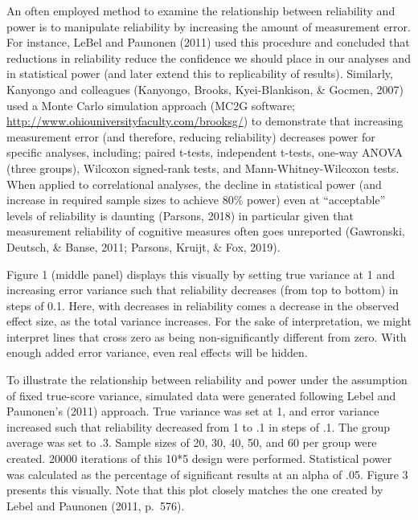 \documentclass[english,,man]{apa6}
\begin{document}
An often employed method to examine the relationship between reliability and power is to manipulate reliability by increasing the amount of measurement error. For instance, LeBel and Paunonen (2011) used this procedure and concluded that reductions in reliability reduce the confidence we should place in our analyses and in statistical power (and later extend this to replicability of results). Similarly, Kanyongo and colleagues (Kanyongo, Brooks, Kyei-Blankison, \& Gocmen, 2007) used a Monte Carlo simulation approach (MC2G software; \url{http://www.ohiouniversityfaculty.com/brooksg/}) to demonstrate that increasing measurement error (and therefore, reducing reliability) decreases power for specific analyses, including; paired t-tests, independent t-tests, one-way ANOVA (three groups), Wilcoxon signed-rank tests, and Mann-Whitney-Wilcoxon tests. When applied to correlational analyses, the decline in statistical power (and increase in required sample sizes to achieve 80\% power) even at \enquote{acceptable} levels of reliability is daunting (Parsons, 2018) in particular given that measurement reliability of cognitive measures often goes unreported (Gawronski, Deutsch, \& Banse, 2011; Parsons, Kruijt, \& Fox, 2019).

Figure 1 (middle panel) displays this visually by setting true variance at 1 and increasing error variance such that reliability decreases (from top to bottom) in steps of 0.1. Here, with decreases in reliability comes a decrease in the observed effect size, as the total variance increases. For the sake of interpretation, we might interpret lines that cross zero as being non-significantly different from zero. With enough added error variance, even real effects will be hidden.

To illustrate the relationship between reliability and power under the assumption of fixed true-score variance, simulated data were generated following Lebel and Paunonen's (2011) approach. True variance was set at 1, and error variance increased such that reliability decreased from 1 to .1 in steps of .1. The group average was set to .3. Sample sizes of 20, 30, 40, 50, and 60 per group were created. 20000 iterations of this 10*5 design were performed. Statistical power was calculated as the percentage of significant results at an alpha of .05. Figure 3 presents this visually. Note that this plot closely matches the one created by Lebel and Paunonen (2011, p.~576).
\end{document}
